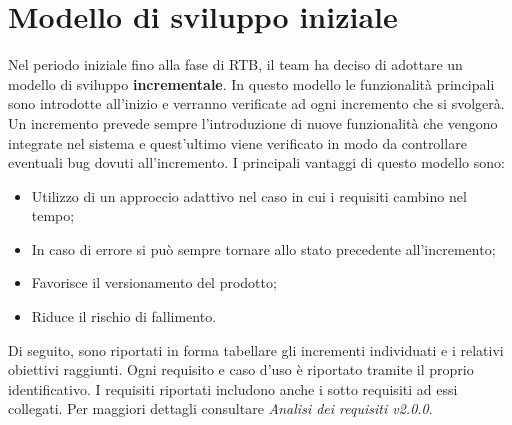 \section{Modello di sviluppo iniziale}
Nel periodo iniziale fino alla fase di RTB, il team ha deciso di adottare un modello di sviluppo \textbf{incrementale}. In questo
modello le funzionalità principali sono introdotte all'inizio e verranno verificate 
ad ogni incremento che si svolgerà. Un incremento prevede sempre l'introduzione di nuove
funzionalità che vengono integrate nel sistema e quest'ultimo viene verificato in modo da
controllare eventuali bug dovuti all'incremento. I principali vantaggi di questo modello sono:
\begin{itemize}
    \item Utilizzo di un approccio adattivo nel caso in cui i requisiti cambino nel tempo;
    \item In caso di errore si può sempre tornare allo stato precedente all'incremento;
    \item Favorisce il versionamento del prodotto;
    \item Riduce il rischio di fallimento.
\end{itemize} 
Di seguito, sono riportati in forma tabellare gli incrementi individuati e i relativi obiettivi raggiunti. Ogni requisito
e caso d'uso è riportato tramite il proprio identificativo. I requisiti riportati includono anche i sotto requisiti ad essi collegati.
Per maggiori dettagli consultare \textit{Analisi dei requisiti v2.0.0}.

\renewcommand{\arraystretch}{1.8}

